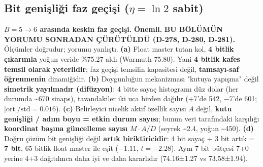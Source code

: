 \documentclass[11pt]{article}
\newenvironment{notkutu}{\def\FrameCommand{\fboxsep=6pt\colorbox{kutu}}\MakeFramed{\advance\hsize-\width\FrameRestore}\small}{\endMakeFramed}
\begin{document}
\subsection*{Bit genişliği faz geçişi ($\eta=\ln2$ sabit)}
\begin{center}\small{}\end{center}
\textbf{$B{=}5 \to 6$ arasında keskin faz geçişi.}
\begin{notkutu}\textbf{Önemli.} \textbf{BU BÖLÜMÜN YORUMU SONRADAN ÇÜRÜTÜLDÜ (D-278, D-280, D-281).} Ölçümler doğrudur; yorumu yanlıştı. \textbf{(a)} Float master tutan kol, \textbf{4 bitlik çıkarımla} yoğun veride \%75.27 aldı (Warmuth 75.80). Yani \textbf{4 bitlik kafes temsil olarak yeterlidir}; faz geçişi temsilin kapasitesi değil, \textbf{tamsayı-saf öğrenmenin} dinamiğidir. \textbf{(b)} Doygunluğun mekanizması "kutuya yapışma" değil \textbf{simetrik yayılmadır (difüzyon)}: 4 bitte sayaç histogramı düz dolar (her durumda \textasciitilde{}670 sinaps), tavandakiler iki uca birden dağılır (+7'de 542, −7'de 601; $\lvert\text{ort}\rvert/\text{std}=0.016$). \textbf{(c)} Belirleyici nicelik aktif özellik sayısı $A$ değil, \textbf{kutu genişliği / adım boyu = etkin durum sayısı}; bunun veri tarafındaki karşılığı \textbf{koordinat başına güncelleme sayısı} $M\cdot A/D$ (seyrek \textasciitilde{}2.4, yoğun \textasciitilde{}450). \textbf{(d)} Doğru çözüm bit genişliği değil \textbf{artık biriktiricidir}: 4 bit sayaç + 3 bit artık = \textbf{7 bit}, 65 bitlik float master ile eşit ($-1.11$, $t{=}-2.28$). Aynı 7 bit bütçesi 7+0 yerine 4+3 dağıtılınca daha iyi ve daha kararlıdır (74.16±1.27 vs 73.58±1.94).
\end{notkutu}
\end{document}
